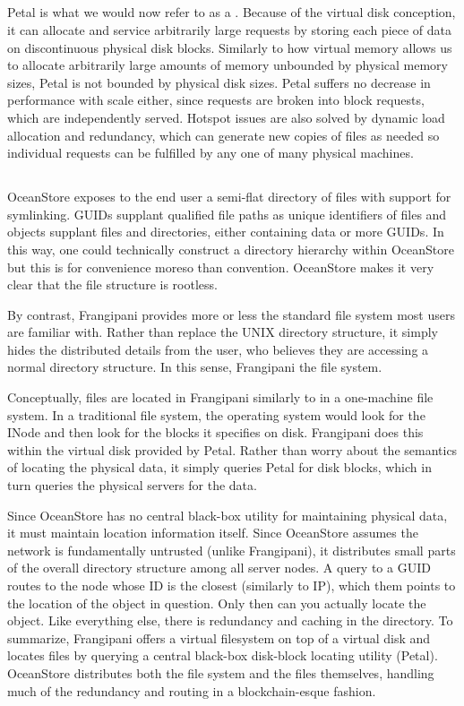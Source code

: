\documentclass{article}
\begin{document}
\subsection{}
Petal is what we would now refer to as a . Because of the virtual disk conception, it can allocate and service arbitrarily large requests by storing each piece of data on discontinuous physical disk blocks. Similarly to how virtual memory allows us to allocate arbitrarily large amounts of memory unbounded by physical memory sizes, Petal is not bounded by physical disk sizes. Petal suffers no decrease in performance with scale either, since requests are broken into block requests, which are independently served. Hotspot issues are also solved by dynamic load allocation and redundancy, which can generate new copies of files as needed so individual requests can be fulfilled by any one of many physical machines.

\subsection{}
OceanStore exposes to the end user a semi-flat directory of files with support for symlinking. GUIDs supplant qualified file paths as unique identifiers of files and objects supplant files and directories, either containing data or more GUIDs. In this way, one could technically construct a directory hierarchy within OceanStore but this is for convenience moreso than convention. OceanStore makes it very clear that the file structure is rootless.

By contrast, Frangipani provides more or less the standard file system most users are familiar with. Rather than replace the UNIX directory structure, it simply hides the distributed details from the user, who believes they are accessing a normal directory structure. In this sense, Frangipani  the file system.

Conceptually, files are located in Frangipani similarly to in a one-machine file system. In a traditional file system, the operating system would look for the INode and then look for the blocks it specifies on disk. Frangipani does this within the virtual disk provided by Petal. Rather than worry about the semantics of locating the physical data, it simply queries Petal for disk blocks, which in turn queries the physical servers for the data.

Since OceanStore has no central black-box utility for maintaining physical data, it must maintain location information itself. Since OceanStore assumes the network is fundamentally untrusted (unlike Frangipani), it distributes small parts of the overall directory structure among all server nodes. A query to a GUID routes to the node whose ID is the closest (similarly to IP), which them points to the location of the object in question. Only then can you actually locate the object. Like everything else, there is redundancy and caching in the directory. To summarize, Frangipani offers a virtual filesystem on top of a virtual disk and locates files by querying a central black-box disk-block locating utility (Petal). OceanStore distributes both the file system and the files themselves, handling much of the redundancy and routing in a blockchain-esque fashion.
\end{document}

